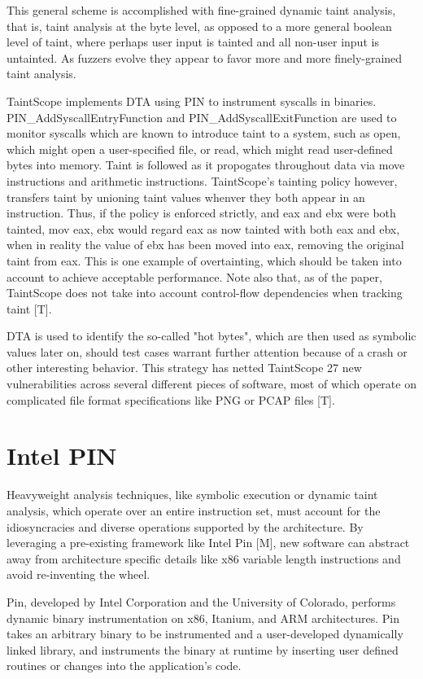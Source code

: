 \documentclass[11pt,expanded,copyright]{fsuthesis}
\begin{document}
This general scheme is accomplished with fine-grained dynamic taint analysis, that is, taint analysis at the byte level, as opposed to a more general boolean level of taint, where perhaps user input is tainted and all non-user input is untainted. As fuzzers evolve they appear to favor more and more finely-grained taint analysis.

TaintScope implements DTA using PIN to instrument syscalls in binaries. PIN\_AddSyscallEntryFunction and PIN\_AddSyscallExitFunction are used to monitor syscalls which are known to introduce taint to a system, such as open, which might open a user-specified file, or read, which might read user-defined bytes into memory. Taint is followed as it propogates throughout data via move instructions and arithmetic instructions. TaintScope's tainting policy however, transfers taint by unioning taint values whenver they both appear in an instruction. Thus, if the policy is enforced strictly, and eax and ebx were both tainted, mov eax, ebx would regard eax as now tainted with both eax and ebx, when in reality the value of ebx has been moved into eax, removing the original taint from eax. This is one example of overtainting, which should be taken into account to achieve acceptable performance. Note also that, as of the paper, TaintScope does not take into account control-flow dependencies when tracking taint [T].

DTA is used to identify the so-called "hot bytes", which are then used as symbolic values later on, should test cases warrant further attention because of a crash or other interesting behavior. This strategy has netted TaintScope 27 new vulnerabilities across several different pieces of software, most of which operate on complicated file format specifications like PNG or PCAP files [T].

\section{Intel PIN}

Heavyweight analysis techniques, like symbolic execution or dynamic taint analysis, which operate over an entire instruction set, must account for the idiosyncracies and diverse operations supported by the architecture. By leveraging a pre-existing framework like Intel Pin [M], new software can abstract away from architecture specific details like x86 variable length instructions and avoid re-inventing the wheel.

Pin, developed by Intel Corporation and the University of Colorado, performs dynamic binary instrumentation on x86, Itanium, and ARM architectures. Pin takes an arbitrary binary to be instrumented and a user-developed dynamically linked library, and instruments the binary at runtime by inserting user defined routines or changes into the application's code.
\end{document}
